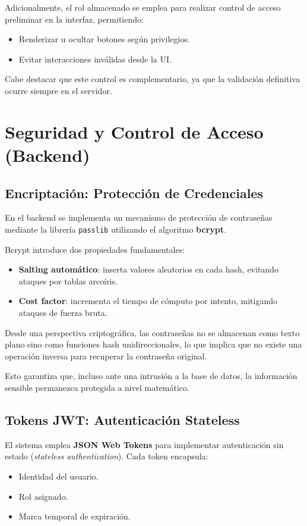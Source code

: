 \documentclass[12pt,letterpaper]{article}
\begin{document}
Adicionalmente, el rol almacenado se emplea para realizar control de acceso preliminar en la interfaz, permitiendo:
\begin{itemize}
    \item Renderizar u ocultar botones según privilegios.
    \item Evitar interacciones inválidas desde la UI.
\end{itemize}

Cabe destacar que este control es complementario, ya que la validación definitiva ocurre siempre en el servidor.

\section{Seguridad y Control de Acceso (Backend)}

\subsection{Encriptación: Protección de Credenciales}

En el backend se implementa un mecanismo de protección de contraseñas mediante la librería \texttt{passlib} utilizando el algoritmo \textbf{bcrypt}.

Bcrypt introduce dos propiedades fundamentales:
\begin{itemize}
    \item \textbf{Salting automático}: inserta valores aleatorios en cada hash, evitando ataques por tablas arcoíris.
    \item \textbf{Cost factor}: incrementa el tiempo de cómputo por intento, mitigando ataques de fuerza bruta.
\end{itemize}

Desde una perspectiva criptográfica, las contraseñas no se almacenan como texto plano sino como funciones hash unidireccionales, lo que implica que no existe una operación inversa para recuperar la contraseña original.

Esto garantiza que, incluso ante una intrusión a la base de datos, la información sensible permanezca protegida a nivel matemático.

\subsection{Tokens JWT: Autenticación Stateless}

El sistema emplea \textbf{JSON Web Tokens} para implementar autenticación sin estado (\textit{stateless authentication}). Cada token encapsula:
\begin{itemize}
    \item Identidad del usuario.
    \item Rol asignado.
    \item Marca temporal de expiración.
\end{itemize}
\end{document}

